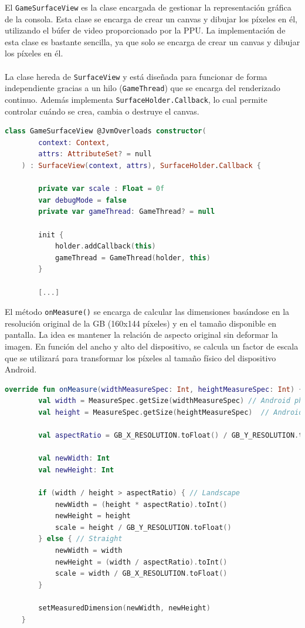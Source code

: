 El \texttt{GameSurfaceView} es la clase encargada de gestionar la representación gráfica de la consola. Esta clase se encarga de crear un canvas y dibujar los píxeles en él, utilizando el búfer de video proporcionado por la PPU. La implementación de esta clase es bastante sencilla, ya que solo se encarga de crear un canvas y dibujar los píxeles en él.
\\\\
La clase hereda de \texttt{SurfaceView} y está diseñada para funcionar de forma independiente gracias a un hilo (\texttt{GameThread}) que se encarga del renderizado continuo. Además implementa \texttt{SurfaceHolder.Callback}, lo cual permite controlar cuándo se crea, cambia o destruye el canvas.

\begin{lstlisting}[language=Kotlin, caption={Creación del Game Surface View.}, label={code:surfaceview}]
    class GameSurfaceView @JvmOverloads constructor(
        context: Context,
        attrs: AttributeSet? = null
    ) : SurfaceView(context, attrs), SurfaceHolder.Callback {

        private var scale : Float = 0f
        var debugMode = false
        private var gameThread: GameThread? = null

        init {
            holder.addCallback(this)
            gameThread = GameThread(holder, this)
        }

        [...]

\end{lstlisting}

El método \texttt{onMeasure()} se encarga de calcular las dimensiones basándose en la resolución original de la GB (160x144 píxeles) y en el tamaño disponible en pantalla. La idea es mantener la relación de aspecto original sin deformar la imagen. En función del ancho y alto del dispositivo, se calcula un factor de escala que se utilizará para transformar los píxeles al tamaño físico del dispositivo Android.

\begin{lstlisting}[language=Kotlin, caption={Medición y Escalado del Canvas.}, label={code:surfaceonmeasure}]
    override fun onMeasure(widthMeasureSpec: Int, heightMeasureSpec: Int) {
        val width = MeasureSpec.getSize(widthMeasureSpec) // Android phone total width
        val height = MeasureSpec.getSize(heightMeasureSpec)  // Android phone total height

        val aspectRatio = GB_X_RESOLUTION.toFloat() / GB_Y_RESOLUTION.toFloat() // GB Aspect Ratio

        val newWidth: Int
        val newHeight: Int

        if (width / height > aspectRatio) { // Landscape
            newWidth = (height * aspectRatio).toInt()
            newHeight = height
            scale = height / GB_Y_RESOLUTION.toFloat()
        } else { // Straight
            newWidth = width
            newHeight = (width / aspectRatio).toInt()
            scale = width / GB_X_RESOLUTION.toFloat()
        }

        setMeasuredDimension(newWidth, newHeight)
    }
    
\end{lstlisting}

